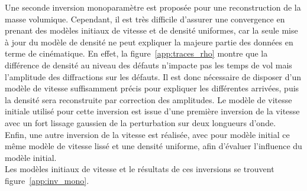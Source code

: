 Une seconde inversion monoparamètre est proposée pour une reconstruction de la masse volumique. Cependant, il est très difficile d'assurer une convergence en prenant des modèles initiaux de vitesse et de densité uniformes, car la seule mise à jour du modèle de densité ne peut expliquer la majeure partie des données en terme de cinématique. En effet, la figure~\ref{app:traces_rho} montre que la différence de densité au niveau des défauts n'impacte pas les temps de vol mais l'amplitude des diffractions sur les défauts. Il est donc nécessaire de disposer d'un modèle de vitesse suffisamment précis pour expliquer les différentes arrivées, puis la densité sera reconstruite par correction des amplitudes. Le modèle de vitesse initiale utilisé pour cette inversion est issue d'une première inversion de la vitesse avec un fort lissage gaussien de la perturbation sur deux longueurs d'onde.\\

Enfin, une autre inversion de la vitesse est réalisée, avec pour modèle initial ce même modèle de vitesse lissé et une densité uniforme, afin d'évaluer l'influence du modèle initial.\\

Les modèles initiaux de vitesse et le résultats de ces inversions se trouvent figure~\ref{app:inv_mono}. 


